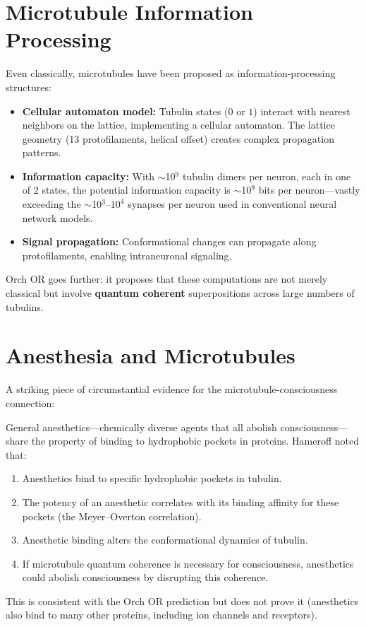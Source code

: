 \documentclass[11pt,a4paper]{report}
\begin{document}
\section{Microtubule Information Processing}

Even classically, microtubules have been proposed as information-processing structures:

\begin{biobox}
\begin{itemize}[leftmargin=1.5em]
  \item \textbf{Cellular automaton model:} Tubulin states ($0$ or $1$) interact with nearest neighbors on the lattice, implementing a cellular automaton. The lattice geometry (13 protofilaments, helical offset) creates complex propagation patterns.
  \item \textbf{Information capacity:} With $\sim$10$^9$ tubulin dimers per neuron, each in one of 2 states, the potential information capacity is $\sim$10$^9$ bits per neuron---vastly exceeding the $\sim$10$^3$--$10^4$ synapses per neuron used in conventional neural network models.
  \item \textbf{Signal propagation:} Conformational changes can propagate along protofilaments, enabling intraneuronal signaling.
\end{itemize}
\end{biobox}

Orch OR goes further: it proposes that these computations are not merely classical but involve \textbf{quantum coherent} superpositions across large numbers of tubulins.

\section{Anesthesia and Microtubules}

A striking piece of circumstantial evidence for the microtubule-consciousness connection:

\begin{predbox}
General anesthetics---chemically diverse agents that all abolish consciousness---share the property of binding to hydrophobic pockets in proteins. Hameroff noted that:
\begin{enumerate}[leftmargin=1.5em]
  \item Anesthetics bind to specific hydrophobic pockets in tubulin.
  \item The potency of an anesthetic correlates with its binding affinity for these pockets (the Meyer--Overton correlation).
  \item Anesthetic binding alters the conformational dynamics of tubulin.
  \item If microtubule quantum coherence is necessary for consciousness, anesthetics could abolish consciousness by disrupting this coherence.
\end{enumerate}
This is consistent with the Orch OR prediction but does not prove it (anesthetics also bind to many other proteins, including ion channels and receptors).
\end{predbox}
\end{document}
